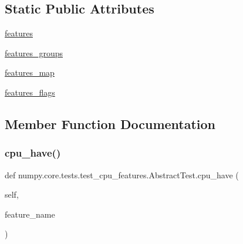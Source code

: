 \subsection*{Static Public Attributes}
\begin{DoxyCompactItemize}
\item 
\hyperlink{classnumpy_1_1core_1_1tests_1_1test__cpu__features_1_1AbstractTest_ab8d9057b798c0370b68782452a4a7783}{features}
\item 
\hyperlink{classnumpy_1_1core_1_1tests_1_1test__cpu__features_1_1AbstractTest_abbc6fae27e30574b53664a43e7514e17}{features\+\_\+groups}
\item 
\hyperlink{classnumpy_1_1core_1_1tests_1_1test__cpu__features_1_1AbstractTest_a20cb89eae962201abd2ca4f5b2d7f78c}{features\+\_\+map}
\item 
\hyperlink{classnumpy_1_1core_1_1tests_1_1test__cpu__features_1_1AbstractTest_a0a2a9d567c472b2dd191c3e6760c1a3a}{features\+\_\+flags}
\end{DoxyCompactItemize}


\subsection{Member Function Documentation}
\mbox{\label{classnumpy_1_1core_1_1tests_1_1test__cpu__features_1_1AbstractTest_aef999fab1ee037f07049fa44446417a4}} 
\subsubsection{\texorpdfstring{cpu\+\_\+have()}{cpu\_have()}}
{\footnotesize\ttfamily def numpy.\+core.\+tests.\+test\+\_\+cpu\+\_\+features.\+Abstract\+Test.\+cpu\+\_\+have (\begin{DoxyParamCaption}\item[{}]{self,  }\item[{}]{feature\+\_\+name }\end{DoxyParamCaption})}

\mbox{\label{classnumpy_1_1core_1_1tests_1_1test__cpu__features_1_1AbstractTest_abadf42424a4f47393e320263d5dddd80}} 
